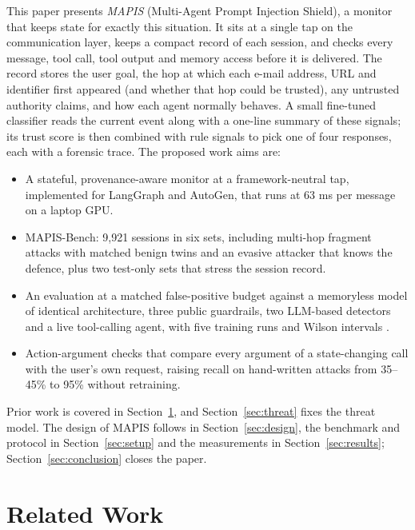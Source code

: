 \documentclass{ieeeaccess}
\begin{document}
This paper presents \emph{MAPIS} (Multi-Agent Prompt Injection Shield), a monitor that keeps state for exactly this situation. It sits at a single tap on the communication layer, keeps a compact record of each session, and checks every message, tool call, tool output and memory access before it is delivered. The record stores the user goal, the hop at which each e-mail address, URL and identifier first appeared (and whether that hop could be trusted), any untrusted authority claims, and how each agent normally behaves. A small fine-tuned classifier reads the current event along with a one-line summary of these signals; its trust score is then combined with rule signals to pick one of four responses, each with a forensic trace. The proposed work aims are:
\begin{itemize}
\item A stateful, provenance-aware monitor at a framework-neutral tap, implemented for LangGraph and AutoGen, that runs at 63 ms per message on a laptop GPU.
\item MAPIS-Bench: 9,921 sessions in six sets, including multi-hop fragment attacks with matched benign twins and an evasive attacker that knows the defence, plus two test-only sets that stress the session record.
\item An evaluation at a matched false-positive budget against a memoryless model of identical architecture, three public guardrails, two LLM-based detectors and a live tool-calling agent, with five training runs and Wilson intervals \cite{wilson1927}.
\item Action-argument checks that compare every argument of a state-changing call with the user's own request, raising recall on hand-written attacks from 35--45\% to 95\% without retraining.
\end{itemize}
Prior work is covered in Section~\ref{sec:related}, and Section~\ref{sec:threat} fixes the threat model. The design of MAPIS follows in Section~\ref{sec:design}, the benchmark and protocol in Section~\ref{sec:setup} and the measurements in Section~\ref{sec:results}; Section~\ref{sec:conclusion} closes the paper.

\section{Related Work}
\label{sec:related}
\end{document}
